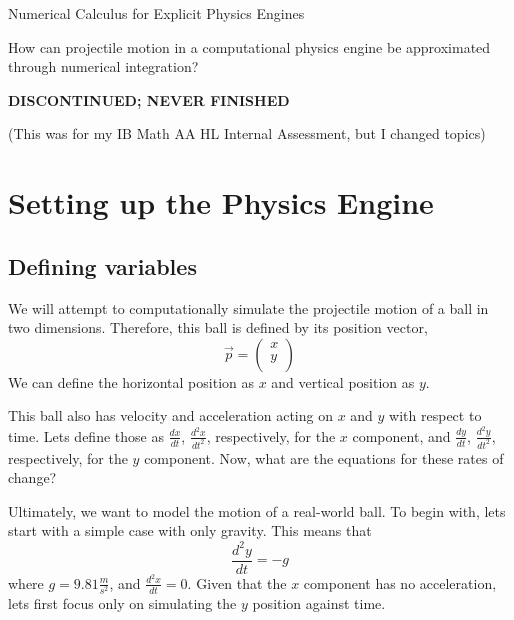 \documentclass[12pt]{article}
\begin{document}
\begin{titlepage}
   \begin{center}
        \vspace*{5cm}

        \Huge{Numerical Calculus for Explicit Physics Engines}

        \vspace{1cm}
        \LARGE{How can projectile motion in a computational physics engine be approximated through numerical integration?}
            
        \vspace{2 cm}
        \LARGE{\textbf{DISCONTINUED; NEVER FINISHED}}
        
        \large{(This was for my IB Math AA HL Internal Assessment, but I changed topics)}
       
       

       \vfill
    \end{center}
\end{titlepage}
    
\tableofcontents
\newpage


\section{Setting up the Physics Engine}
\subsection{Defining variables}
We will attempt to computationally simulate the projectile motion of a ball in two dimensions. Therefore, this ball is defined by its position vector, $$\vec p = \begin{pmatrix} x \\ y \\
\end{pmatrix}$$We can define the horizontal position as $x$ and vertical position as $y$. 

This ball also has velocity and acceleration acting on $x$ and $y$ with respect to time. Lets define those as $\frac{dx}{dt}$, $\frac{d^2x}{dt^2}$, respectively, for the $x$ component, and $\frac{dy}{dt}$, $\frac{d^2y}{dt^2}$, respectively, for the $y$ component. Now, what are the equations for these rates of change? 

Ultimately, we want to model the motion of a real-world ball. To begin with, lets start with a simple case with only gravity. This means that $$\frac{d^2y}{dt} = -g$$ where $g=9.81\frac{m}{s^2}$, and $\frac{d^2x}{dt} = 0$. Given that the $x$ component has no acceleration, lets first focus only on simulating the $y$ position against time.
\end{document}
